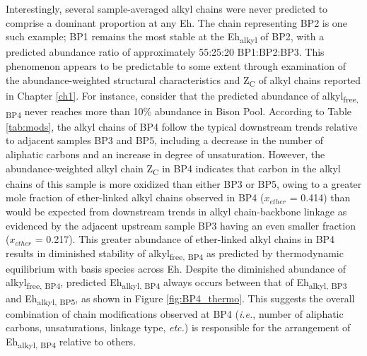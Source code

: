 Interestingly, several sample-averaged alkyl chains were never predicted to comprise a dominant proportion at any Eh. The chain representing BP2 is one such example; BP1 remains the most stable at the Eh\textsubscript{alkyl} of BP2, with a predicted abundance ratio of approximately 55:25:20 BP1:BP2:BP3. This phenomenon appears to be predictable to some extent through examination of the abundance-weighted structural characteristics and Z\textsubscript{C} of alkyl chains reported in Chapter \ref{ch1}. For instance, consider that the predicted abundance of alkyl\textsubscript{free, BP4} never reaches more than 10\% abundance in Bison Pool. According to Table \ref{tab:mods}, the alkyl chains of BP4 follow the typical downstream trends relative to adjacent samples BP3 and BP5, including a decrease in the number of aliphatic carbons and an increase in degree of unsaturation. However, the abundance-weighted alkyl chain Z\textsubscript{C} in BP4 indicates that carbon in the alkyl chains of this sample is more oxidized than either BP3 or BP5, owing to a greater mole fraction of ether-linked alkyl chains observed in BP4 ($x_{ether}$ = 0.414) than would be expected from downstream trends in alkyl chain-backbone linkage as evidenced by the adjacent upstream sample BP3 having an even smaller fraction ($x_{ether}$ = 0.217). This greater abundance of ether-linked alkyl chains in BP4 results in diminished stability of alkyl\textsubscript{free, BP4} as predicted by thermodynamic equilibrium with basis species across Eh. Despite the diminished abundance of alkyl\textsubscript{free, BP4}, predicted Eh\textsubscript{alkyl, BP4} always occurs between that of Eh\textsubscript{alkyl, BP3} and Eh\textsubscript{alkyl, BP5}, as shown in Figure \ref{fig:BP4_thermo}. This suggests the overall combination of chain modifications observed at BP4 (\textit{i.e.}, number of aliphatic carbons, unsaturations, linkage type, \textit{etc.}) is responsible for the arrangement of Eh\textsubscript{alkyl, BP4} relative to others.




